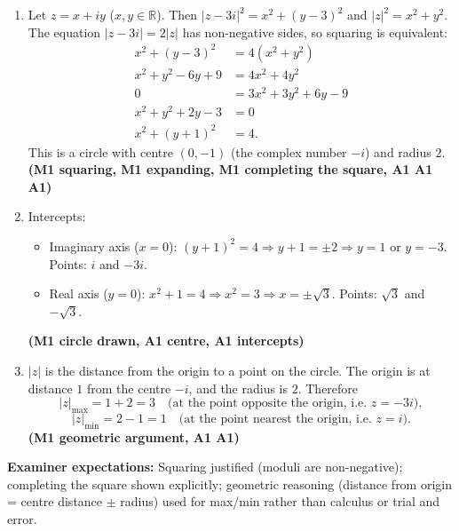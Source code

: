 \documentclass[11pt]{article}
\newcommand{\legende}[1]{\par\vspace{6pt}{\popsemi\fontsize{9}{11.5}\selectfont\color{popmuted}#1}}
\begin{document}
\begin{corrige}
\begin{enumerate}
\item Let $z = x + iy$ ($x,y \in \mathbb{R}$). Then $|z - 3i|^2 = x^2 + (y-3)^2$ and $|z|^2 = x^2 + y^2$.
The equation $|z - 3i| = 2|z|$ has non-negative sides, so squaring is equivalent:
\begin{align*}
x^2 + (y-3)^2 &= 4(x^2 + y^2) \\
x^2 + y^2 - 6y + 9 &= 4x^2 + 4y^2 \\
0 &= 3x^2 + 3y^2 + 6y - 9 \\
x^2 + y^2 + 2y - 3 &= 0 \\
x^2 + (y+1)^2 &= 4.
\end{align*}
This is a circle with centre $(0, -1)$ (the complex number $-i$) and radius $2$. \hfill \textbf{(M1 squaring, M1 expanding, M1 completing the square, A1 A1 A1)}
\item Intercepts:
\begin{itemize}
\item Imaginary axis ($x=0$): $(y+1)^2 = 4 \Rightarrow y+1 = \pm 2 \Rightarrow y = 1$ or $y = -3$. Points: $i$ and $-3i$.
\item Real axis ($y=0$): $x^2 + 1 = 4 \Rightarrow x^2 = 3 \Rightarrow x = \pm\sqrt{3}$. Points: $\sqrt{3}$ and $-\sqrt{3}$.
\end{itemize}
\begin{popfigure}
\legende{Locus: circle of centre $-i$ and radius $2$.}
\end{popfigure}
\hfill \textbf{(M1 circle drawn, A1 centre, A1 intercepts)}
\item $|z|$ is the distance from the origin to a point on the circle. The origin is at distance $1$ from the centre $-i$, and the radius is $2$. Therefore
\[ |z|_{\max} = 1 + 2 = 3 \quad \text{(at the point opposite the origin, i.e. } z = -3i\text{)}, \]
\[ |z|_{\min} = 2 - 1 = 1 \quad \text{(at the point nearest the origin, i.e. } z = i\text{)}. \]
\hfill \textbf{(M1 geometric argument, A1 A1)}
\end{enumerate}
\textbf{Examiner expectations:} Squaring justified (moduli are non-negative); completing the square shown explicitly; geometric reasoning (distance from origin = centre distance $\pm$ radius) used for max/min rather than calculus or trial and error.
\end{corrige}
\end{document}
